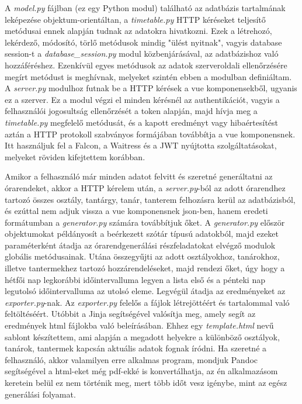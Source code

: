 A \textit{model.py} fájlban (ez egy Python modul) található az adatbázis tartalmának leképezése objektum-orientáltan, a \textit{timetable.py} HTTP kéréseket teljesítő metódusai ennek alapján tudnak az adatokra hivatkozni. Ezek a létrehozó, lekérdező, módosító, törlő metódusok mindig "ülést nyitnak", vagyis database session-t a \textit{database\_session.py} modul közbenjárásával, az adatbázishoz való hozzáféréshez. Ezenkívül egyes metódusok az adatok szerveroldali ellenőrzésére megírt metódust is meghívnak, melyeket szintén ebben a modulban definiáltam. A \textit{server.py} modulhoz futnak be a HTTP kérések a vue komponensekből, ugyanis ez a szerver. Ez a modul végzi el minden kérésnél az authentikációt, vagyis a felhasználói jogosultság ellenőrzését a token alapján, majd hívja meg a \textit{timetable.py} megfelelő metódusát, és a kapott eredményt vagy hibaértesítést aztán a HTTP protokoll szabványos formájában továbbítja a vue komponensnek. Itt használjuk fel a Falcon, a Waitress és a JWT nyújtotta szolgáltatásokat, melyeket röviden kifejtettem korábban.

Amikor a felhasználó már minden adatot felvitt és szeretné generáltatni az órarendeket, akkor a HTTP kérelem után, a \textit{server.py}-ból az adott órarendhez tartozó összes osztály, tantárgy, tanár, tanterem felhozásra kerül az adatbázisból, és ezúttal nem adjuk vissza a vue komponensnek json-ben, hanem eredeti formátumban a \textit{generator.py} számára továbbítjuk őket. A \textit{generator.py} először objektumokat példányosít a beérkezett szótár típusú adatokból, majd ezeket paraméterként átadja az órarendgenerálási részfeladatokat elvégző modulok globális metódusainak. Utána összegyűjti az adott osztályokhoz, tanárokhoz, illetve tantermekhez tartozó hozzárendeléseket, majd rendezi őket, úgy hogy a hétfői nap legkorábbi időintervalluma legyen a lista első és a pénteki nap legutolsó időintervalluma az utolsó eleme. Legvégül átadja az eredményeket az \textit{exporter.py}-nak. Az \textit{exporter.py} felelős a fájlok létrejöttéért és tartalommal való feltöltéséért. Utóbbit a Jinja segítségével valósítja meg, amely segít az eredmények html fájlokba való beleírásában. Ehhez egy \textit{template.html} nevű sablont készítettem, ami alapján a megadott helyekre a különböző osztályok, tanárok, tantermek kapcsán aktuális adatok fognak íródni. Ha szeretné a felhasználó, akkor valamilyen erre alkalmas program, mondjuk Pandoc segítségével a html-eket még pdf-ekké is konvertálhatja, az én alkalmazásom keretein belül ez nem történik meg, mert több időt vesz igénybe, mint az egész generálási folyamat.

